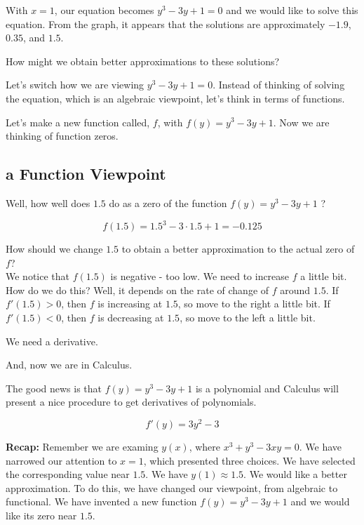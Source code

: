 \documentclass{ximera}
\begin{document}
With $x=1$, our equation becomes $y^3 - 3 y + 1 = 0$ and we would like to solve this equation. From the graph, it appears that the solutions are approximately $-1.9$, $0.35$, and $1.5$.

How might we obtain better approximations to these solutions?





Let's switch how we are viewing $y^3 - 3 y + 1 = 0$.  Instead of thinking of solving the equation, which is an algebraic viewpoint, let's think in terms of functions.

Let's make a new function called, $f$, with $f(y) = y^3 - 3 y + 1$.  Now we are thinking of function zeros. \\








\subsection*{a Function Viewpoint}


Well, how well does $1.5$ do as a zero of the function $f(y) = y^3 - 3 y + 1$ ?


\[  f(1.5) = 1.5^3 - 3 \cdot 1.5 + 1 = -0.125 \]


How should we change $1.5$ to obtain a better approximation to the actual zero of $f$? \\


We notice that $f(1.5)$ is negative - too low.  We need to increase $f$ a little bit.  How do we do this?  Well, it depends on the rate of change of $f$ around $1.5$.  If $f'(1.5) > 0$, then $f$ is increasing at $1.5$, so move to the right a little bit. If $f'(1.5) < 0$, then $f$ is decreasing at $1.5$, so move to the left a little bit. 



We need a derivative.

And, now we are in Calculus.





The good news is that $f(y) = y^3 - 3 y + 1$ is a polynomial and Calculus will present a nice procedure to get derivatives of polynomials.


\[
f'(y) = 3 y^2 - 3
\]




\textbf{Recap: } Remember we are examing $y(x)$, where $x^3 + y^3 - 3xy = 0$.  We have narrowed our attention to $x=1$, which presented three choices. We have selected the corresponding value near $1.5$.  We have $y(1) \approx 1.5$. We would like a better approximation.  To do this, we have changed our viewpoint, from algebraic to functional.  We have invented a new function $f(y) = y^3 - 3 y + 1$ and we would like its zero near $1.5$.
\end{document}
